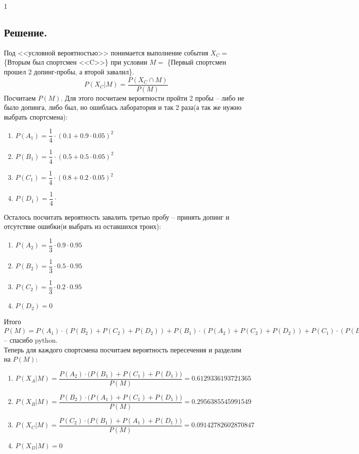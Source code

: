 \documentclass[a4paper, 12pt]{article}
\begin{document}
\begin{spacing}{1}
\subsection{Решение.} Под <<условной вероятностью>> понимается
выполнение события $X_C =$ \{Вторым был спортсмен <<C>>\} при 
условии $M =$ \{Первый спортсмен прошел 2 допинг-пробы,
а второй завалил\}.
$$
P(X_C | M) = \dfrac{P(X_C \cap M)}{P(M)}
$$
Посчитаем $P(M)$. Для этого посчитаем вероятности пройти 2 пробы -- либо не было допинга, либо был, но ошиблась лаборатория и так 2 раза(а так же нужно выбрать спортсмена):
\begin{enumerate}
	\item $P(A_1) = \dfrac14\cdot(0.1 + 0.9 \cdot 0.05)^2$
	\item $P(B_1) = \dfrac14\cdot(0.5 + 0.5 \cdot 0.05)^2$
	\item $P(C_1) = \dfrac14\cdot(0.8 + 0.2 \cdot 0.05)^2$
	\item $P(D_1) = \dfrac14\cdot$
\end{enumerate}
Осталось посчитать вероятность завалить третью пробу -- принять допинг и отсутствие ошибки(и выбрать из оставшихся троих):
\begin{enumerate}
	\item $P(A_2) = \dfrac13\cdot0.9 \cdot 0.95$
	\item $P(B_2) = \dfrac13\cdot0.5 \cdot 0.95$
	\item $P(C_2) = \dfrac13\cdot0.2 \cdot 0.95$
	\item $P(D_2) = 0$
\end{enumerate}
Итого $P(M) = P(A_1)\cdot(P(B_2)+P(C_2)+P(D_2)) + P(B_1)\cdot(P(A_2)+P(C_2)+P(D_2)) + P(C_1)\cdot(P(B_2)+P(A_2)+P(D_2)) + P(D_1)\cdot(P(B_2)+P(C_2)+P(A_2)) = \frac{2.69462275}{12}$ -- спасибо python.\\
Теперь для каждого спортсмена посчитаем вероятность пересечения и разделим на $P(M)$:
\begin{enumerate}
	\item[A:] $P(X_A | M) = \dfrac{P(A_2)\cdot\bigg(P(B_1)+P(C_1) + P(D_1)\bigg)}{P(M)} = 0.6129336193721365$
	\item[B:] $P(X_B | M) = \dfrac{P(B_2)\cdot\bigg(P(A_1)+P(C_1) + P(D_1)\bigg)}{P(M)} =0.2956385545991549$
	\item[C:] $P(X_C | M) = \dfrac{P(C_2)\cdot\bigg(P(B_1)+P(A_1) + P(D_1)\bigg)}{P(M)} = 0.09142782602870847$
	\item[D:] $P(X_D | M) = 0$ 
	
\end{enumerate}
\end{spacing}
\end{document}
